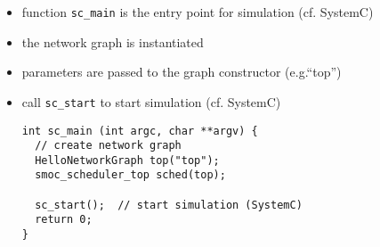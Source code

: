 \begin{frame}[fragile=singleslide]
\begin{itemize}
\item function \lstinline!sc_main! is the entry point for simulation (cf. SystemC)
\item the network graph is instantiated
\item parameters are passed to the graph constructor (e.g.``top'')
\item call \lstinline!sc_start! to start simulation (cf. SystemC)
\begin{lstlisting}
int sc_main (int argc, char **argv) {
  // create network graph
  HelloNetworkGraph top("top");
  smoc_scheduler_top sched(top);

  sc_start();  // start simulation (SystemC)
  return 0;
}
\end{lstlisting}
\end{itemize}
\end{frame}

